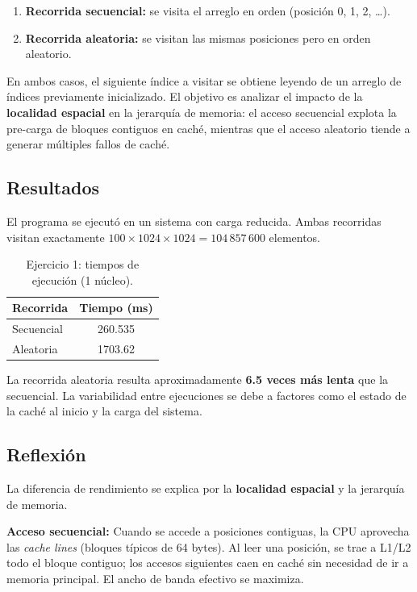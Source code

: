 \documentclass[11pt,a4paper]{article}
\begin{document}
\begin{enumerate}
\item \textbf{Recorrida secuencial:} se visita el arreglo en orden (posición 0, 1, 2, \ldots).
\item \textbf{Recorrida aleatoria:} se visitan las mismas posiciones pero en orden aleatorio.
\end{enumerate}

En ambos casos, el siguiente índice a visitar se obtiene leyendo de un arreglo de índices previamente inicializado. El objetivo es analizar el impacto de la \textbf{localidad espacial} en la jerarquía de memoria: el acceso secuencial explota la pre-carga de bloques contiguos en caché, mientras que el acceso aleatorio tiende a generar múltiples fallos de caché.

\subsection{Resultados}

El programa se ejecutó en un sistema con carga reducida. Ambas recorridas visitan exactamente \(100 \times 1024 \times 1024 = 104\,857\,600\) elementos.

\begin{table}[htbp]
\centering
\begin{tabular}{@{}lc@{}}
\toprule
\textbf{Recorrida} & \textbf{Tiempo (ms)} \\
\midrule
Secuencial         & 260.535              \\
Aleatoria          & 1703.62              \\
\bottomrule
\end{tabular}
\caption{Ejercicio 1: tiempos de ejecución (1 núcleo).}
\label{tab:tiempos}
\end{table}

La recorrida aleatoria resulta aproximadamente \textbf{6.5 veces más lenta} que la secuencial. La variabilidad entre ejecuciones se debe a factores como el estado de la caché al inicio y la carga del sistema.

\subsection{Reflexión}

La diferencia de rendimiento se explica por la \textbf{localidad espacial} y la jerarquía de memoria.

\textbf{Acceso secuencial:} Cuando se accede a posiciones contiguas, la CPU aprovecha las \emph{cache lines} (bloques típicos de 64 bytes). Al leer una posición, se trae a L1/L2 todo el bloque contiguo; los accesos siguientes caen en caché sin necesidad de ir a memoria principal. El ancho de banda efectivo se maximiza.
\end{document}
